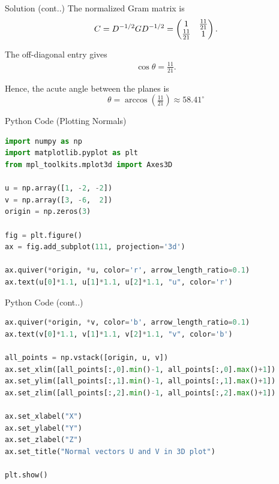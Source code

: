 \documentclass{beamer}
\begin{document}
\begin{frame}{Solution (cont..)}
The normalized Gram matrix is
\begin{align}
C = D^{-1/2} G D^{-1/2} 
= \begin{pmatrix}1 & \tfrac{11}{21} \\ \tfrac{11}{21} & 1\end{pmatrix}.
\end{align}

The off-diagonal entry gives
\begin{align}
\cos\theta = \frac{11}{21}.
\end{align}

Hence, the acute angle between the planes is
\[
\boxed{\theta = \arccos\!\left(\tfrac{11}{21}\right) \approx 58.41^\circ}
\]
\end{frame}

\begin{frame}[fragile]{Python Code (Plotting Normals)}
\begin{lstlisting}[language=Python]
import numpy as np
import matplotlib.pyplot as plt
from mpl_toolkits.mplot3d import Axes3D

u = np.array([1, -2, -2])
v = np.array([3, -6,  2])
origin = np.zeros(3)

fig = plt.figure()
ax = fig.add_subplot(111, projection='3d')

ax.quiver(*origin, *u, color='r', arrow_length_ratio=0.1)
ax.text(u[0]*1.1, u[1]*1.1, u[2]*1.1, "u", color='r')
\end{lstlisting}
\end{frame}

\begin{frame}[fragile]{Python Code (cont..)}
\begin{lstlisting}[language=Python]
ax.quiver(*origin, *v, color='b', arrow_length_ratio=0.1)
ax.text(v[0]*1.1, v[1]*1.1, v[2]*1.1, "v", color='b')

all_points = np.vstack([origin, u, v])
ax.set_xlim([all_points[:,0].min()-1, all_points[:,0].max()+1])
ax.set_ylim([all_points[:,1].min()-1, all_points[:,1].max()+1])
ax.set_zlim([all_points[:,2].min()-1, all_points[:,2].max()+1])

ax.set_xlabel("X")
ax.set_ylabel("Y")
ax.set_zlabel("Z")
ax.set_title("Normal vectors U and V in 3D plot")

plt.show()
\end{lstlisting}
\end{frame}
\end{document}
